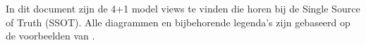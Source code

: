 \documentclass[../views.tex]{subfiles}
\begin{document}
In dit document zijn de 4+1 model views te vinden die horen bij de Single Source of Truth (SSOT). Alle diagrammen en bijbehorende legenda's zijn gebaseerd op de voorbeelden van \textcite{architectural_blueprints}.
\end{document}
